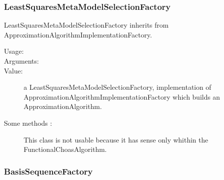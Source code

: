 \newpage
\subsubsection{LeastSquaresMetaModelSelectionFactory}

LeastSquaresMetaModelSelectionFactory inherits from ApproximationAlgorithmImplementationFactory.

\begin{description}
\item[Usage:] \rule{0pt}{1em}

\item[Arguments:] \rule{0pt}{1em}

\item[Value:] a LeastSquaresMetaModelSelectionFactory, implementation of ApproximationAlgorithmImplementationFactory which builds an ApproximationAlgorithm.

\item[Some methods :]  This class is not usable because it has sense only whithin the FunctionalChoasAlgorithm.

\end{description}


\newpage
\subsubsection{BasisSequenceFactory}

